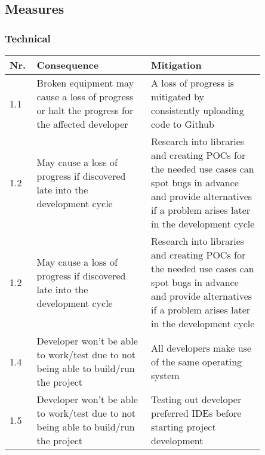 \documentclass{article} %
\begin{document}
\subsection{Measures}

\subsubsection{Technical}

\begin{center}
    \begin{tabular}{| p{0.05\linewidth} | p{0.4\linewidth} | p{0.4\linewidth} |}
        \hline
        Nr. & Consequence                                                                                   & Mitigation                                                                                                                                                              \\ [0.5ex]
        \hline\hline
        1.1 & Broken equipment may cause a loss of progress or halt the progress for the affected developer & A loss of progress is mitigated by consistently uploading code to Github                                                                                                \\
        \hline
        1.2 & May cause a loss of progress if discovered late into the development cycle                    & Research into libraries and creating POCs for the needed use cases can spot bugs in advance and provide alternatives if a problem arises later in the development cycle \\
        \hline
        1.2 & May cause a loss of progress if discovered late into the development cycle                    & Research into libraries and creating POCs for the needed use cases can spot bugs in advance and provide alternatives if a problem arises later in the development cycle \\
        \hline
        1.4 & Developer won't be able to work/test due to not being able to build/run the project           & All developers make use of the same operating system                                                                                                                    \\
        \hline
        1.5 & Developer won't be able to work/test due to not being able to build/run the project           & Testing out developer preferred IDEs before starting project development                                                                                                \\ [1ex]
        \hline
    \end{tabular}
\end{center}
\end{document}
